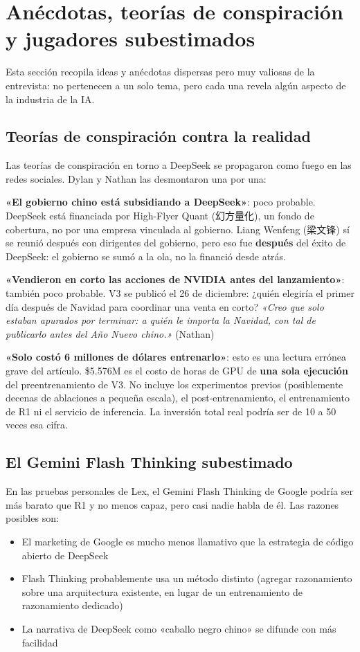 \documentclass[a4paper]{article}
\begin{document}
\section{Anécdotas, teorías de conspiración y jugadores subestimados}

Esta sección recopila ideas y anécdotas dispersas pero muy valiosas de la entrevista: no pertenecen a un solo tema, pero cada una revela algún aspecto de la industria de la IA.

\subsection{Teorías de conspiración contra la realidad}

Las teorías de conspiración en torno a DeepSeek se propagaron como fuego en las redes sociales. Dylan y Nathan las desmontaron una por una:

\textbf{«El gobierno chino está subsidiando a DeepSeek»}: poco probable. DeepSeek está financiada por High-Flyer Quant (幻方量化), un fondo de cobertura, no por una empresa vinculada al gobierno. Liang Wenfeng (梁文锋) sí se reunió después con dirigentes del gobierno, pero eso fue \textbf{después} del éxito de DeepSeek: el gobierno se sumó a la ola, no la financió desde atrás.

\textbf{«Vendieron en corto las acciones de NVIDIA antes del lanzamiento»}: también poco probable. V3 se publicó el 26 de diciembre: ¿quién elegiría el primer día después de Navidad para coordinar una venta en corto? \textit{«Creo que solo estaban apurados por terminar: a quién le importa la Navidad, con tal de publicarlo antes del Año Nuevo chino.»} (Nathan)

\textbf{«Solo costó 6 millones de dólares entrenarlo»}: esto es una lectura errónea grave del artículo. \$5.576M es el costo de horas de GPU de \textbf{una sola ejecución} del preentrenamiento de V3. No incluye los experimentos previos (posiblemente decenas de ablaciones a pequeña escala), el post-entrenamiento, el entrenamiento de R1 ni el servicio de inferencia. La inversión total real podría ser de 10 a 50 veces esa cifra.

\subsection{El Gemini Flash Thinking subestimado}

En las pruebas personales de Lex, el Gemini Flash Thinking de Google podría ser más barato que R1 y no menos capaz, pero casi nadie habla de él. Las razones posibles son:
\begin{itemize}
    \item El marketing de Google es mucho menos llamativo que la estrategia de código abierto de DeepSeek
    \item Flash Thinking probablemente usa un método distinto (agregar razonamiento sobre una arquitectura existente, en lugar de un entrenamiento de razonamiento dedicado)
    \item La narrativa de DeepSeek como «caballo negro chino» se difunde con más facilidad
\end{itemize}
\end{document}
